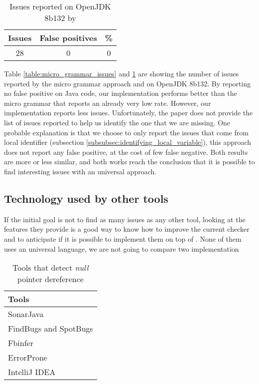 \begin{table}[h]
	\centering
	\caption{Issues reported on OpenJDK 8b132 by \slang{}}
	\label{table:slang_issues_jdk8}
	\begin{tabular}{|c|c|c|}
		\hline
		\bf Issues & \bf False positives & \bf \% \\ \hline
		28 &  0 &  0 \\ \hline
	\end{tabular}
\end{table}

Table \ref{table:micro_grammar_issues} and \ref{table:slang_issues_jdk8} are showing the number of issues reported by the micro grammar approach and \slang{} on OpenJDK 8b132.
By reporting no false positive on Java code, our implementation performs better than the micro grammar that reports an already very low rate.
However, our implementation reports less issues.
Unfortunately, the paper does not provide the list of issues reported to help us identify the one that we are missing.
One probable explanation is that we choose to only report the issues that come from local identifier (subsection \ref{subsubsec:identifying_local_variable}), this approach does not report any false positive, at the cost of few false negative.
Both results are more or less similar, and both works reach the conclusion that it is possible to find interesting issues with an universal approach.

\subsection{Technology used by other tools}
\label{subsec:other_tools_technology}

If the initial goal is not to find as many issues as any other tool, looking at the features they provide is a good way to know how to improve the current checker and to anticipate if it is possible to implement them on top of \slang{}.
None of them uses an universal language, we are not going to compare two implementation


\begin{table}[h]
	\centering
	\caption{Tools that detect \emph{null} pointer dereference}
	\label{table:tools_features}
	\begin{tabular}{|l|}
		\hline
		\bf Tools \\
		\hline
		SonarJava \cite{SonarJava:2019:Online} \\
		FindBugs \cite{Hovemeyer:2004:FBE:1052883.1052895} and SpotBugs \cite{spotBugs:2019:Online} \\
		Fbinfer \cite{fbInfer:2019:Online} \\
		ErrorProne \cite{errorProne:2019:Online} \\
		IntelliJ IDEA \cite{intelJIDEA:2019:Online} \\
		\hline    
	\end{tabular}
\end{table}

